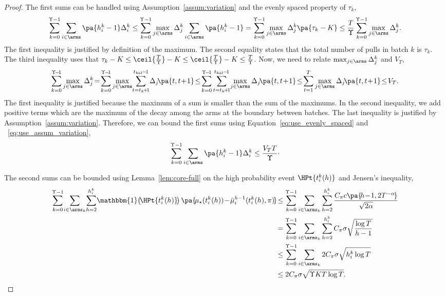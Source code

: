 \begin{proof}
The first sums can be handled using Assumption~\ref{assum:variation} and the evenly spaced property of $\tau_k$,
\begin{equation}
\label{eq:use_evenly_spaced}
\sum_{k=0}^{\Upsilon-1} \sum_{i\in\arms} \pa{h_i^k-1}\Delta_i^k \leq \sum_{k=0}^{\Upsilon-1} \max_{j\in \arms} \Delta_j^k\sum_{i\in\arms} \pa{h_i^k-1} = \sum_{k=0}^{\Upsilon-1} \max_{j\in \arms} \Delta_j^k \pa{\tau_k-K} \leq \frac{T}{\Upsilon}\sum_{k=0}^{\Upsilon-1} \max_{j\in \arms} \Delta_j^k.
\end{equation}
%
The first inequality is justified by definition of the maximum. The second equality states that the total number of pulls in batch $k$ is $\tau_k$. The third inequality uses that $\tau_k - K \leq \ceil{\frac{T}{\Upsilon}} -K \leq \ceil{\frac{T}{\Upsilon}} -K \leq \frac{T}{\Upsilon}$. Now, we need to relate $\max_{j\in \arms} \Delta_j^k$ and $V_T$,
\begin{equation}
\label{eq:use_assum_variation}
   \sum_{k=0}^{\Upsilon\!-\!1}\max_{j\in \arms} \Delta_j^k \!=\! \sum_{k=0}^{\Upsilon\!-\!1}\max_{j\in \arms} \!\sum_{t = t_k\!+\!1}^{t_{k\!+\!1}\!-\!1}\! \Delta_j\! \pa{t,t\!+\!1} \!\leq\! \sum_{k=0}^{\Upsilon\!-\!1} \sum_{t = t_k\!+\!1}^{t_{k\!+\!1}\!-\!1} \! \max_{j\in \arms} \Delta_j\!\pa{t,t\!+\!1} \!\leq\!  \sum_{t = 1}^{T}\max_{j\in \arms} \Delta_j\!\pa{t,t\!+\!1}\!\leq\! V_T .
\end{equation}
%
The first inequality is justified because the maximum of a sum is smaller than the sum of the maximums. In the second inequality, we add positive terms which are the maximum of the decay among the arms at the boundary between batches. The last inequality is justified by Assumption~\ref{assum:variation}. Therefore, we can bound the first sums using Equation~\ref{eq:use_evenly_spaced} and ~\ref{eq:use_assum_variation},
\begin{equation}
\label{eq:bound_sum1}
\sum_{k=0}^{\Upsilon-1} \sum_{i\in\arms} \pa{h_i^k-1}\Delta_i^k \leq \frac{V_T T }{\Upsilon}\cdot    
\end{equation}


The second sums can be bounded using Lemma~\ref{lem:core-full} on the high probability event $\HPt{t_i^k(h)}$ and Jensen's inequality,
\begin{align}
    \sum_{k=0}^{\Upsilon-1} \!\sum_{i\in\arms_k}\!\sum_{h=2}^{h^k_{i}}\!\mathbbm{1}\!\left(\!\HPt{t_i^k(h)}\!\right)\pa{\! \mu_{\star}(t_i^k(h)) \!- \!\bar{\mu}_i^{h-1}(t_i^k(h),\pi)\!} \!&\leq \sum_{k=0}^{\Upsilon-1} \sum_{i\in\arms_k} \sum_{h=2}^{h^k_{i}} \frac{C_\pi c\pa{\!h\!-\!1, 2T^{-\alpha}\!}}{\sqrt{2\alpha}} \nonumber\\
&= \sum_{k=0}^{\Upsilon-1} \sum_{i\in\arms_k} \sum_{h=2}^{h^k_{i}}C_\pi\sigma \sqrt{\frac{\log{T}}{h -1}}\nonumber\\
&\leq \sum_{k=0}^{\Upsilon-1} \sum_{i\in\arms_k} 2 C_\pi \sigma \sqrt{h_i^k \log{T}}\nonumber\\
&\leq  2 C_\pi \sigma \sqrt{\Upsilon K T\log{T}} .
\label{eq:bound_sum2}
\end{align}


\end{proof}
